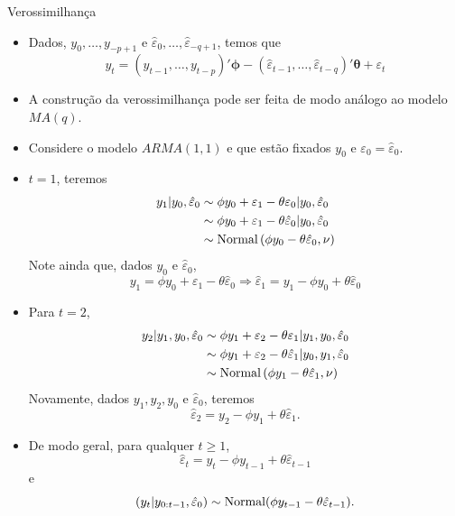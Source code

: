 \documentclass[
  letterpaper,
  DIV=11,
  numbers=noendperiod]{scrartcl}
\theoremstyle{plain}
\theoremstyle{plain}
\theoremstyle{definition}
\theoremstyle{definition}
\theoremstyle{remark}
\begin{document}
\begin{frame}{Verossimilhança}
    \begin{itemize}
        \item Dados, $y_{0},\ldots,y_{-p+1}$ e $\hat{\varepsilon}_0,\ldots,\hat{\varepsilon}_{-q+1}$, temos que
            $$y_t=(y_{t-1},\ldots,y_{t-p})'\bm{\phi} -(\hat{\varepsilon}_{t-1},\ldots,\hat{\varepsilon}_{t-q} )'\bm{\theta}+\varepsilon_t$$
        \item A construção da verossimilhança pode ser feita de modo análogo ao modelo $MA(q)$.
        \item Considere o modelo $ARMA(1,1)$ e que estão fixados $y_0$ e $\varepsilon_0=\hat{\varepsilon}_0$.
        \item $t=1$, teremos 
        \begin{align*}
        y_1|y_0,\hat{\varepsilon}_0 &\sim \phi y_0 + \varepsilon_1-\theta\varepsilon_0|y_0,\hat{\varepsilon}_0 \\
        &\sim \phi y_0 + \varepsilon_1-\theta\hat{\varepsilon}_0|y_0,\hat{\varepsilon}_0\\
        &\sim \hbox{Normal}\left(\phi y_0 -\theta\hat{\varepsilon}_0, \nu\right)
        \end{align*}
        Note ainda que, dados $y_0$ e $\hat{\varepsilon}_0$,
        $$y_1=\phi y_0+\varepsilon_1-\theta \hat{\varepsilon}_{0}\Rightarrow \hat{\varepsilon}_1=y_1 - \phi y_0 + \theta\hat{\varepsilon}_0$$       
    \end{itemize}   
\end{frame}

\begin{frame}
    \begin{itemize}
        \item Para $t=2$,
        \begin{align*}
        y_2|y_1,y_0,\hat{\varepsilon}_0 &\sim \phi y_1 + \varepsilon_2-\theta\varepsilon_1|y_1,y_0,\hat{\varepsilon}_0 \\
        &\sim \phi y_1 + \varepsilon_2-\theta\hat{\varepsilon}_1|y_0,y_1,\hat{\varepsilon}_0\\
        &\sim \hbox{Normal}\left(\phi y_1 -\theta\hat{\varepsilon}_1, \nu\right)
        \end{align*}
        Novamente, dados $y_1,y_2,y_0$ e $\hat{\varepsilon}_0$, teremos
        $$\hat{\varepsilon}_2=y_2 - \phi y_1 + \theta\hat{\varepsilon}_1.$$     
        \item De modo geral, para qualquer $t\geq 1$,
        $$\hat{\varepsilon}_t= y_t - \phi y_{t-1} + \theta \hat{\varepsilon}_{t-1}$$
        e
        $$(y_t|y_{0:t-1},\hat{\varepsilon}_0)\sim\hbox{Normal}( \phi y_{t-1} - \theta \hat{\varepsilon}_{t-1}).$$
        
    \end{itemize}   
\end{frame}
\end{document}
